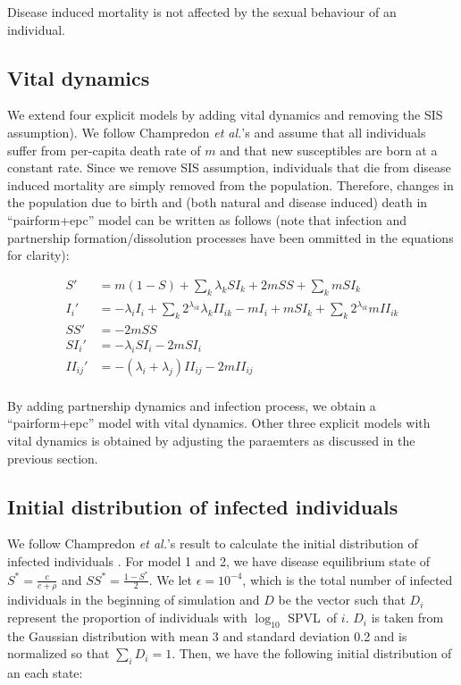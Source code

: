 \documentclass[10pt,letterpaper]{article}
\newcommand{\Lspvl}{$\log_{10}$ SPVL}
\newcommand{\etal}{\textit{et al.}}
\begin{document}
Disease induced mortality is not affected by the sexual behaviour of an individual. 

\subsection*{Vital dynamics}

We extend four explicit models by adding vital dynamics and removing the SIS assumption). We follow Champredon \etal's \cite{champredon_hiv_2013} and assume that all individuals suffer from per-capita death rate of $m$ and that new susceptibles are born at a constant rate. Since we remove SIS assumption, individuals that die from disease induced mortality are simply removed from the population. Therefore, changes in the population due to birth and (both natural and disease induced) death in ``pairform+epc'' model can be written as follows (note that infection and partnership formation/dissolution processes have been ommitted in the equations for clarity):

$$
\begin{aligned}
S' &= m(1 - S) + \sum_k \lambda_k SI_k + 2 m SS + \sum_k m SI_k \\
I_i' &= - \lambda_i I_i + \sum_k 2^{\lambda_{ik}} \lambda_k II_{ik} - m I_i + m SI_k + \sum_k 2^{\lambda_{ik}} m II_{ik} \\
SS' &= - 2 m SS \\
SI_i' &= - \lambda_i SI_i - 2 m SI_i \\
II_{ij}' &= - (\lambda_i + \lambda_j) II_{ij} - 2 m II_{ij} \\
\end{aligned}
$$

By adding partnership dynamics and infection process, we obtain a ``pairform+epc'' model with vital dynamics. Other three explicit models with vital dynamics is obtained by adjusting the paraemters as discussed in the previous section.

\subsection*{Initial distribution of infected individuals}

We follow Champredon \etal's result to calculate the initial distribution of infected individuals \cite{champredon_hiv_2013}. For model 1 and 2, we have disease equilibrium state of $S^* = \frac{c}{c + \rho}$ and $SS^* = \frac{1-S^*}{2}$. We let $\epsilon = 10^{-4}$, which is the total number of infected individuals in the beginning of simulation and $D$ be the vector such that $D_i$ represent the proportion of individuals with \Lspvl\ of $i$. $D_i$ is taken from the Gaussian distribution with mean 3 and standard deviation 0.2 and is normalized so that $\sum_i D_i = 1$. Then, we have the following initial distribution of an each state:
\end{document}
